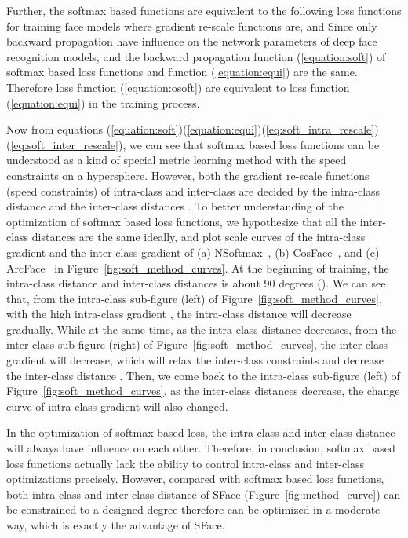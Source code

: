 \documentclass[journal,comsoc]{IEEEtran}
\begin{document}
Further, the softmax based functions are equivalent to the following loss functions for training face models
	where gradient re-scale functions are,  and  Since only backward propagation have influence on the network parameters of deep face recognition models, and the backward propagation function (\ref{equation:soft}) of softmax based loss functions and function (\ref{equation:equi}) are the same. Therefore loss function (\ref{equation:osoft}) are equivalent to loss function (\ref{equation:equi}) in the training process. 

Now from equations (\ref{equation:soft})(\ref{equation:equi})(\ref{eq:soft_intra_rescale})(\ref{eq:soft_inter_rescale}), we can see that softmax based loss functions can be understood as a kind of special metric learning method with the speed constraints on a hypersphere. However, both the gradient re-scale functions (speed constraints) of intra-class and inter-class are decided by the intra-class distance  and the inter-class distances . To better understanding of the optimization of softmax based loss functions, we hypothesize that all the inter-class distances  are the same ideally, and plot scale curves of the intra-class gradient  and the inter-class gradient  of (a) NSoftmax~\cite{wang2017normface}, (b) CosFace~\cite{Wang2018CosFace}, and (c) ArcFace~\cite{deng2019arcface} in Figure~\ref{fig:soft_method_curves}. At the beginning of training, the intra-class distance  and inter-class distances  is about 90 degrees (). We can see that, from the intra-class sub-figure (left) of Figure~\ref{fig:soft_method_curves}, with the high intra-class gradient , the intra-class distance  will decrease gradually. While at the same time, as the intra-class distance  decreases, from the inter-class sub-figure (right) of Figure~\ref{fig:soft_method_curves}, the inter-class gradient  will decrease, which will relax the inter-class constraints and decrease the inter-class distance . Then, we come back to the intra-class sub-figure (left) of Figure~\ref{fig:soft_method_curves}, as the inter-class distances  decrease, the change curve of intra-class gradient    will also changed. 

In the optimization of softmax based loss, the intra-class and inter-class distance will always have influence on each other. Therefore, in conclusion, softmax based loss functions actually lack the ability to control intra-class and inter-class optimizations precisely. However, compared with softmax based loss functions, both intra-class and inter-class distance of SFace (Figure~\ref{fig:method_curve}) can be constrained to a designed degree therefore can be optimized in a moderate way, which is exactly the advantage of SFace.   
\end{document}
